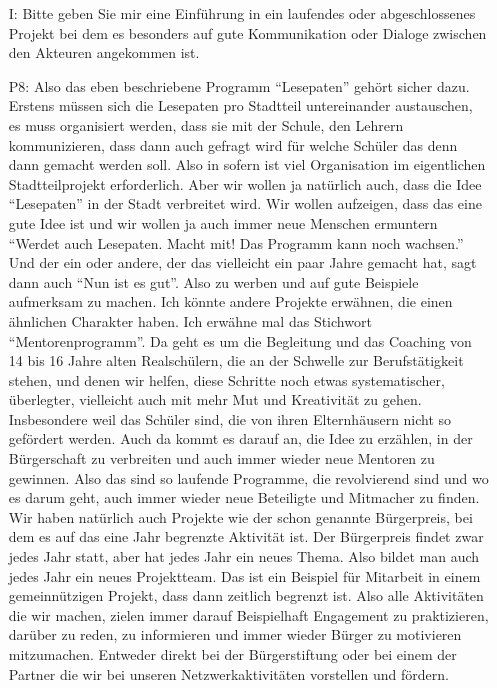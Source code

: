 \begin{itemize}
dass wir uns gefragt haben "`Warum gibt es das nicht in anderen Stadtteilen?"'. Und inzwischen gibt es ein Lesepaten-Netzwerk der B{\"u}rgerstiftung weil es uns gelungen ist, vier {\"a}hnliche Projekte in anderen Stadtteilen zu entwickeln. Also in sofern sind wir selbst auch ein Anbieter von B{\"u}rgerengagement. Aber wir legen gro{\ss}en Wert darauf, dass wir wei{\ss}e Flecken bedienen, und nicht in Konkurrenz zu bestehendem Engagement treten.
    \item[I:] Bitte geben Sie mir eine Einf{\"u}hrung in ein laufendes oder abgeschlossenes Projekt bei dem es besonders auf gute Kommunikation oder Dialoge zwischen den Akteuren angekommen ist.
    \item[P8:] Also das eben beschriebene Programm "`Lesepaten"' geh{\"o}rt sicher dazu. Erstens m{\"u}ssen sich die Lesepaten pro Stadtteil untereinander austauschen, es muss organisiert werden, dass sie mit der Schule, den Lehrern kommunizieren, dass dann auch gefragt wird f{\"u}r welche Sch{\"u}ler das denn dann gemacht werden soll. Also in sofern ist viel Organisation im eigentlichen Stadtteilprojekt erforderlich. Aber wir wollen ja nat{\"u}rlich auch, dass die Idee "`Lesepaten"' in der Stadt verbreitet wird. Wir wollen aufzeigen, dass das eine gute Idee ist und wir wollen ja auch immer neue Menschen ermuntern "`Werdet auch Lesepaten. Macht mit! Das Programm kann noch wachsen."' Und der ein oder andere, der das vielleicht ein paar Jahre gemacht hat, sagt dann auch "`Nun ist es gut"'. Also zu werben und auf gute Beispiele aufmerksam zu machen. Ich k{\"o}nnte andere Projekte erw{\"a}hnen, die einen {\"a}hnlichen Charakter haben. Ich erw{\"a}hne mal das Stichwort "`Mentorenprogramm"'. Da geht es um die Begleitung und das Coaching von 14 bis 16 Jahre alten Realsch{\"u}lern, die an der Schwelle zur Berufst{\"a}tigkeit stehen, und denen wir helfen, diese Schritte noch etwas systematischer, {\"u}berlegter, vielleicht auch mit mehr Mut und Kreativit{\"a}t zu gehen. Insbesondere weil das Sch{\"u}ler sind, die von ihren Elternh{\"a}usern nicht so gef{\"o}rdert werden. Auch da kommt es darauf an, die Idee zu erz{\"a}hlen, in der B{\"u}rgerschaft zu verbreiten und auch immer wieder neue Mentoren zu gewinnen. Also das sind so laufende Programme, die revolvierend sind und wo es darum geht, auch immer wieder neue Beteiligte und Mitmacher zu finden. Wir haben nat{\"u}rlich auch Projekte wie der schon genannte B{\"u}rgerpreis, bei dem es auf das eine Jahr begrenzte Aktivit{\"a}t ist. Der B{\"u}rgerpreis findet zwar jedes Jahr statt, aber hat jedes Jahr ein neues Thema. Also bildet man auch jedes Jahr ein neues Projektteam. Das ist ein Beispiel f{\"u}r Mitarbeit in einem gemeinn{\"u}tzigen Projekt, dass dann zeitlich begrenzt ist. Also alle Aktivit{\"a}ten die wir machen, zielen immer darauf Beispielhaft Engagement zu praktizieren, dar{\"u}ber zu reden, zu informieren und immer wieder B{\"u}rger zu motivieren mitzumachen. Entweder direkt bei der B{\"u}rgerstiftung oder bei einem der Partner die wir bei unseren Netzwerkaktivit{\"a}ten vorstellen und f{\"o}rdern.
\end{itemize}

